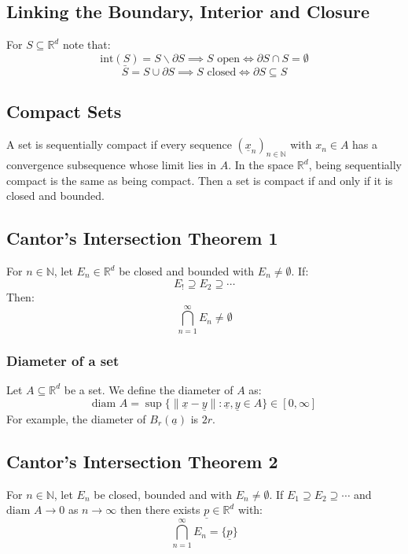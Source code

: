 \documentclass[12pt]{article}
\newcommand{\seq}[2]{(#1_#2)_{#2\in\mathbb{N}}}
\begin{document}
\subsection{Linking the Boundary, Interior and Closure}
For \(S\subseteq\mathbb{R}^d\) note that:
\[\text{int}(S)=S\backslash \partial S\implies S\text{ open} \iff \partial S\cap S=\emptyset\]
\[\bar{S}=S\cup\partial S\implies S\text{ closed}\iff \partial S\subseteq S\]
\subsection{Compact Sets}
A set is sequentially compact if every sequence \(\seq{\underline{x}}{n}\) with \(x_n\in A\) has a convergence subsequence whose limit lies in \(A\). In the space \(\mathbb{R}^d\), being sequentially compact is the same as being compact. Then a set is compact if and only if it is closed and bounded.
\subsection{Cantor's Intersection Theorem 1}
For \(n\in\mathbb{N}\), let \(E_n\in\mathbb{R}^d\) be closed and bounded with \(E_n\ne\emptyset\). If:
\[E_!\supseteq E_2\supseteq\cdots\]
Then:
\[\bigcap^\infty_{n=1}E_n\ne\emptyset\]
\subsubsection{Diameter of a set}
Let \(A\subseteq \mathbb{R}^d\) be a set. We define the diameter of \(A\) as:
\[\text{diam }A=\sup\{\|\underline{x}-\underline{y}\|:\underline{x},\underline{y}\in A\}\in[0,\infty]\]
For example, the diameter of \(B_r(\underline{a})\) is \(2r\).
\subsection{Cantor's Intersection Theorem 2}
For \(n\in\mathbb{N}\), let \(E_n\) be closed, bounded and with \(E_n\ne \emptyset\). If \(E_1\supseteq E_2\supseteq\cdots\) and \(\text{diam }A\to 0\) as \(n\to\infty\) then there exists \(\underline{p}\in\mathbb{R}^d\) with:
\[\bigcap^\infty_{n=1}E_n=\{\underline{p}\}\]
\end{document}
